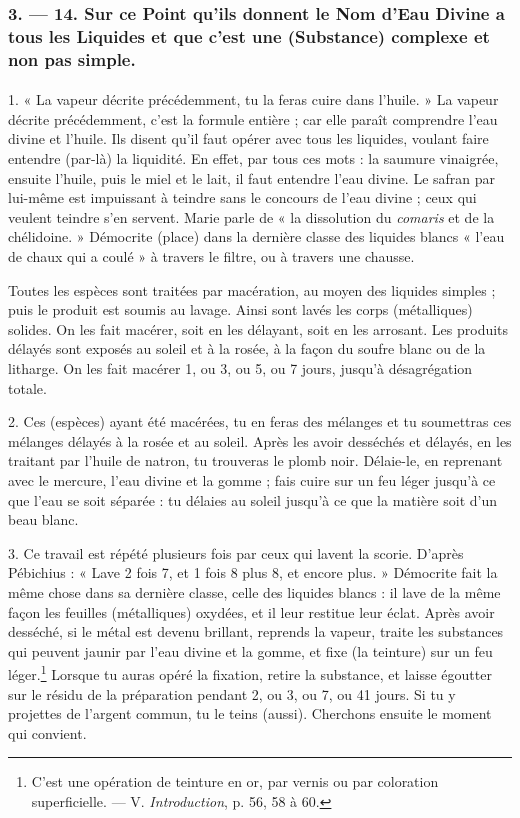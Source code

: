 \documentclass[landscape, a4paper, 11pt, oneside, polutonikogreek, french]{article}
\begin{document}
\bigskip
\centerline{\EightStarTaper}
\centerline{\EightStarTaper\EightStarTaper}
\bigskip

\subsubsection{3. --- 14. Sur ce Point qu'ils donnent le Nom d'Eau Divine a tous les Liquides et que c'est une (Substance) complexe et non pas simple.}
\paragraph{}
1. « La vapeur décrite précédemment, tu la feras cuire dans l'huile. » La vapeur décrite précédemment, c'est la formule entière ; car elle paraît comprendre l'eau divine et l'huile. Ils disent qu'il faut opérer avec tous les liquides, voulant faire entendre (par-là) la liquidité. En effet, par tous ces mots : la saumure vinaigrée, ensuite l'huile, puis le miel et le lait, il faut entendre l'eau divine. Le safran par lui-même est impuissant à teindre sans le concours de l'eau divine ; ceux qui veulent teindre s'en servent. Marie parle de « la dissolution du \emph{comaris} et de la chélidoine. » Démocrite (place) dans la dernière classe des liquides blancs « l'eau de chaux qui a coulé » à travers le filtre, ou à travers une chausse.

Toutes les espèces sont traitées par macération, au moyen des liquides simples ; puis le produit est soumis au lavage. Ainsi sont lavés les corps (métalliques) solides. On les fait macérer, soit en les délayant, soit en les arrosant. Les produits délayés sont exposés au soleil et à la rosée, à la façon du soufre blanc ou de la litharge. On les fait macérer 1, ou 3, ou 5, ou 7 jours, jusqu'à désagrégation totale.

2. Ces (espèces) ayant été macérées, tu en feras des mélanges et tu soumettras ces mélanges délayés à la rosée et au soleil. Après les avoir desséchés et délayés, en les traitant par l'huile de natron, tu trouveras le plomb noir. Délaie-le, en reprenant avec le mercure, l'eau divine et la gomme ; fais cuire sur un feu léger jusqu'à ce que l'eau se soit séparée : tu délaies au soleil jusqu'à ce que la matière soit d'un beau blanc.

3. Ce travail est répété plusieurs fois par ceux qui lavent la scorie. D'après Pébichius : « Lave 2 fois 7, et 1 fois 8 plus 8, et encore plus. » Démocrite fait la même chose dans sa dernière classe, celle des liquides blancs : il lave de la même façon les feuilles (métalliques) oxydées, et il leur restitue leur éclat. Après avoir desséché, si le métal est devenu brillant, reprends la vapeur, traite les substances qui peuvent jaunir par l'eau divine et la gomme, et fixe (la teinture) sur un feu léger.\footnote{C'est une opération de teinture en or, par vernis ou par coloration superficielle. --- V. \emph{Introduction}, p. 56, 58 à 60.} Lorsque tu auras opéré la fixation, retire la substance, et laisse égoutter sur le résidu de la préparation pendant 2, ou 3, ou 7, ou 41 jours. Si tu y projettes de l'argent commun, tu le teins (aussi). Cherchons ensuite le moment qui convient.
\end{document}
